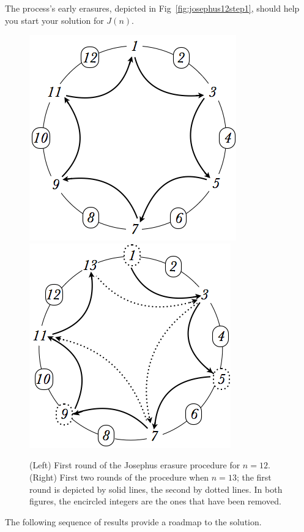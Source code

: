 \begin{enumerate}
The process's early erasures, depicted in Fig~\ref{fig:josephus12step1}, should help you start your solution for $J(n)$.
\begin{figure}[ht]
\begin{center}
        \includegraphics[scale=0.35]{FiguresMaths/josephus12step1}
        \hspace*{.2in}
        \includegraphics[scale=0.35]{FiguresMaths/josephus13}
\caption{(Left) First round of the Josephus erasure procedure for $n=12$.
(Right) First two rounds of the procedure when $n=13$; the first round is depicted by solid lines, the second by dotted lines. In both figures, the encircled integers are the ones that have been removed.}
        \label{fig:josephus12step1}  \label{fig:josephus13}
\end{center}
\end{figure}

The following sequence of results provide a roadmap to the solution.


\end{enumerate}
